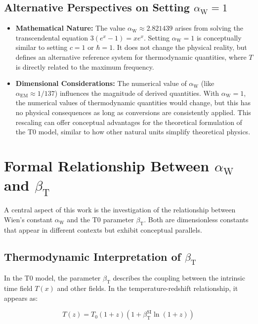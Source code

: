 \documentclass[12pt,a4paper]{article}
\newcommand{\Tfield}{T(x)}
\newcommand{\betaT}{\beta_{\text{T}}}
\newcommand{\alphaEM}{\alpha_{\text{EM}}}
\newcommand{\alphaW}{\alpha_{\text{W}}}
\begin{document}
	\subsection{Alternative Perspectives on Setting \(\alphaW = 1\)}
	\label{subsec:alternative_perspectives}
	
	\begin{itemize}
		\item \textbf{Mathematical Nature:} The value \(\alphaW \approx 2.821439\) arises from solving the transcendental equation \(3(e^x - 1) = xe^x\). Setting \(\alphaW = 1\) is conceptually similar to setting \(c = 1\) or \(\hbar = 1\). It does not change the physical reality, but defines an alternative reference system for thermodynamic quantities, where \(T\) is directly related to the maximum frequency.
		\item \textbf{Dimensional Considerations:} The numerical value of \(\alphaW\) (like \(\alphaEM \approx 1/137\)) influences the magnitude of derived quantities. With \(\alphaW = 1\), the numerical values of thermodynamic quantities would change, but this has no physical consequences as long as conversions are consistently applied. This rescaling can offer conceptual advantages for the theoretical formulation of the T0 model, similar to how other natural units simplify theoretical physics.
	\end{itemize}
	
	\section{Formal Relationship Between \(\alphaW\) and \(\betaT\)}
	\label{sec:relationship_alpha_beta}
	
	A central aspect of this work is the investigation of the relationship between Wien's constant \(\alphaW\) and the T0 parameter \(\betaT\). Both are dimensionless constants that appear in different contexts but exhibit conceptual parallels.
	
	\subsection{Thermodynamic Interpretation of \(\betaT\)}
	\label{subsec:thermodynamic_beta}
	
	In the T0 model, the parameter \(\betaT\) describes the coupling between the intrinsic time field \(\Tfield\) and other fields. In the temperature-redshift relationship, it appears as:
	
	\begin{equation}
		T(z) = T_0 (1 + z) (1 + \betaT^{\text{SI}} \ln(1 + z))
	\end{equation}
	
\end{document}
